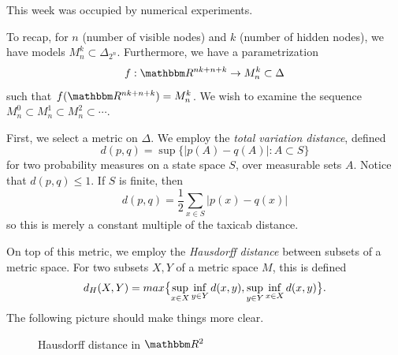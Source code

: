 \documentclass[12pt]{article}
\begin{document}
This week was occupied by numerical experiments.

To recap, for $n$ (number of visible nodes) and $k$ (number of hidden nodes), we
have models $M_n^k \subset \Delta_{2^n}$.  Furthermore, we have a
parametrization
\[
    f: \R^{nk + n + k} \to M_n^k \subset \Delta
\]
such that $f(\R^{nk+n+k}) = M_n^k$.  We wish to examine the sequence $M_n^0
\subset M_n^1 \subset M_n^2 \subset \cdots$.

First, we select a metric on $\Delta$.  We employ the \emph{total variation
distance}, defined 
\[
    d(p, q) = \sup \{ |p(A) - q(A)| : A \subset S\}
\]
for two probability measures on a state space $S$, over measurable sets $A$.
Notice that $d(p, q) \le 1$.  If $S$ is finite, then
\[
    d(p, q) = \frac 1 2 \sum_{x \in S} |p(x) - q(x)|
\]
so this is merely a constant multiple of the taxicab distance.

On top of this metric, we employ the \emph{Hausdorff distance} between subsets
of a metric space.  For two subsets $X, Y$ of a metric space $M$, this is defined
\[
    d_H(X, Y) = max \cdel[\big]{
        \sup_{x \in X} \inf_{y \in Y} d(x, y),
        \sup_{y \in Y} \inf_{x \in X} d(x, y)
    }.
\]
The following picture should make things more clear.
\begin{figure}[H]
    \centering
    \caption{Hausdorff distance in $\R^2$}
\end{figure}
\end{document}
